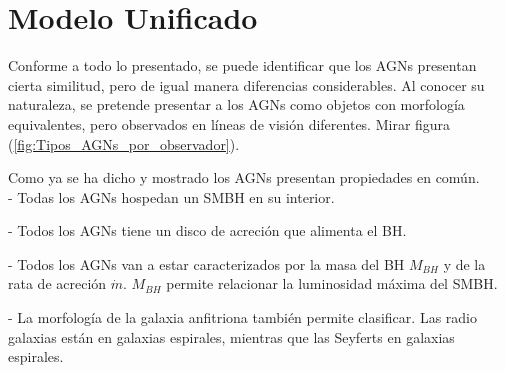 \section{Modelo Unificado}
\label{sec:Unified_models}

Conforme a todo lo presentado, se puede identificar que los AGNs presentan cierta similitud, pero de igual manera diferencias considerables. Al conocer su naturaleza, se pretende presentar a los AGNs como objetos con morfología equivalentes, pero observados en líneas de visión diferentes. Mirar figura (\ref{fig:Tipos_AGNs_por_observador}).

Como ya se ha dicho y mostrado los AGNs presentan propiedades en común. \\

- Todas los AGNs hospedan un SMBH en su interior. 

- Todos los AGNs tiene un disco de acreción que alimenta el BH.

- Todos los AGNs van a estar caracterizados por la masa del BH $M_{BH}$ y de la rata de acreción $\dot{m}$. $M_{BH}$ permite relacionar la luminosidad máxima del SMBH. 

- La morfología de la galaxia anfitriona también permite clasificar. Las radio galaxias están en galaxias espirales, mientras que las Seyferts en galaxias espirales.





